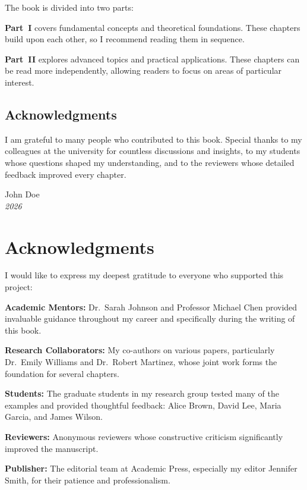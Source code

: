\documentclass[11pt,twoside,openright]{book}
\theoremstyle{plain}
\theoremstyle{definition}
\theoremstyle{remark}
\newcommand{\bookauthor}{John Doe}
\newcommand{\bookpublisher}{Academic Press}
\newcommand{\bookyear}{2026}
\begin{document}
The book is divided into two parts:

\textbf{Part~I} covers fundamental concepts and theoretical foundations. These chapters build upon each other, so I recommend reading them in sequence.

\textbf{Part~II} explores advanced topics and practical applications. These chapters can be read more independently, allowing readers to focus on areas of particular interest.

\section*{Acknowledgments}

I am grateful to many people who contributed to this book. Special thanks to my colleagues at the university for countless discussions and insights, to my students whose questions shaped my understanding, and to the reviewers whose detailed feedback improved every chapter.

\vspace{1em}
\noindent
\bookauthor \\
\textit{\bookyear}

\cleardoublepage

\chapter*{Acknowledgments}

I would like to express my deepest gratitude to everyone who supported this project:

\textbf{Academic Mentors:} Dr.\ Sarah Johnson and Professor Michael Chen provided invaluable guidance throughout my career and specifically during the writing of this book.

\textbf{Research Collaborators:} My co-authors on various papers, particularly Dr.\ Emily Williams and Dr.\ Robert Martinez, whose joint work forms the foundation for several chapters.

\textbf{Students:} The graduate students in my research group tested many of the examples and provided thoughtful feedback: Alice Brown, David Lee, Maria Garcia, and James Wilson.

\textbf{Reviewers:} Anonymous reviewers whose constructive criticism significantly improved the manuscript.

\textbf{Publisher:} The editorial team at \bookpublisher, especially my editor Jennifer Smith, for their patience and professionalism.
\end{document}
